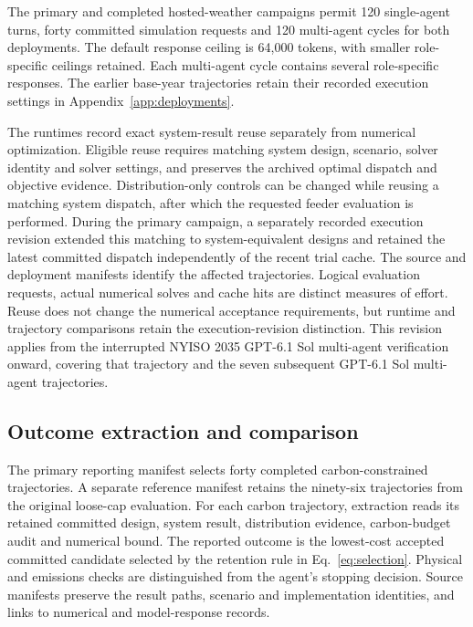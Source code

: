 \documentclass[pdflatex,sn-nature]{sn-jnl}
\begin{document}
The primary and completed hosted-weather campaigns permit 120 single-agent turns, forty committed simulation requests and 120 multi-agent cycles for both deployments. The default response ceiling is 64,000 tokens, with smaller role-specific ceilings retained. Each multi-agent cycle contains several role-specific responses. The earlier base-year trajectories retain their recorded execution settings in Appendix~\ref{app:deployments}.

The runtimes record exact system-result reuse separately from numerical optimization. Eligible reuse requires matching system design, scenario, solver identity and solver settings, and preserves the archived optimal dispatch and objective evidence. Distribution-only controls can be changed while reusing a matching system dispatch, after which the requested feeder evaluation is performed. During the primary campaign, a separately recorded execution revision extended this matching to system-equivalent designs and retained the latest committed dispatch independently of the recent trial cache. The source and deployment manifests identify the affected trajectories. Logical evaluation requests, actual numerical solves and cache hits are distinct measures of effort. Reuse does not change the numerical acceptance requirements, but runtime and trajectory comparisons retain the execution-revision distinction. This revision applies from the interrupted NYISO 2035 GPT-6.1 Sol multi-agent verification onward, covering that trajectory and the seven subsequent GPT-6.1 Sol multi-agent trajectories.

\subsection{Outcome extraction and comparison}

The primary reporting manifest selects forty completed carbon-constrained trajectories. A separate reference manifest retains the ninety-six trajectories from the original loose-cap evaluation. For each carbon trajectory, extraction reads its retained committed design, system result, distribution evidence, carbon-budget audit and numerical bound. The reported outcome is the lowest-cost accepted committed candidate selected by the retention rule in Eq.~\ref{eq:selection}. Physical and emissions checks are distinguished from the agent's stopping decision. Source manifests preserve the result paths, scenario and implementation identities, and links to numerical and model-response records.
\end{document}
